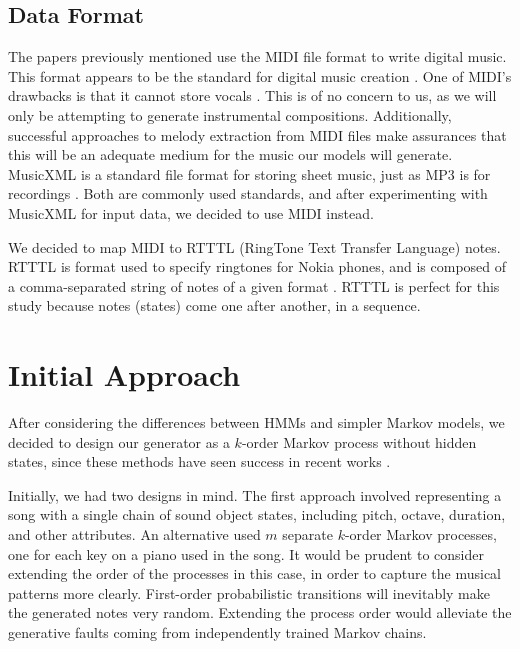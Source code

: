 \documentclass{article}
\begin{document}
\subsection{Data Format}
The papers previously mentioned use the MIDI file format to write digital music. This format appears to be the standard for digital music creation \cite{midi_format}. 
One of MIDI's drawbacks is that it cannot store vocals \cite{cataltepe_2007}. This is of no concern to us, as we will only be attempting to generate instrumental 
compositions. Additionally, successful approaches to melody extraction from MIDI files \cite{ozcan_2005} make assurances that this will be an adequate medium for the 
music our models will generate. MusicXML is a standard file format for storing sheet music, just as MP3 is for recordings \cite{musicxml_2022}. Both are commonly used 
standards, and after experimenting with MusicXML for input data, we decided to use MIDI instead.

We decided to map MIDI to RTTTL (RingTone Text Transfer Language) notes. RTTTL is format used to specify ringtones for Nokia phones, and is composed of a comma-separated 
string of notes of a given format \cite{rtttl_spec}. RTTTL is perfect for this study because notes (states) come one after another, in a sequence.

\section{Initial Approach}
After considering the differences between HMMs and simpler Markov models, we decided to design our generator as a $k$-order Markov process without hidden states, 
since these methods have seen success in recent works \cite{shapiro_huber_2021,correa_jungling_small_2020}. 

Initially, we had two designs in mind. The first approach involved representing a song with a single chain of sound object states, including pitch, octave, duration, 
and other attributes. An alternative used $m$ separate $k$-order Markov processes, one for each key on a piano used in the song. It would be prudent to consider extending 
the order of the processes in this case, in order to capture the musical patterns more clearly. First-order probabilistic transitions will inevitably make the generated 
notes very random. Extending the process order would alleviate the generative faults coming from independently trained Markov chains.
\end{document}
